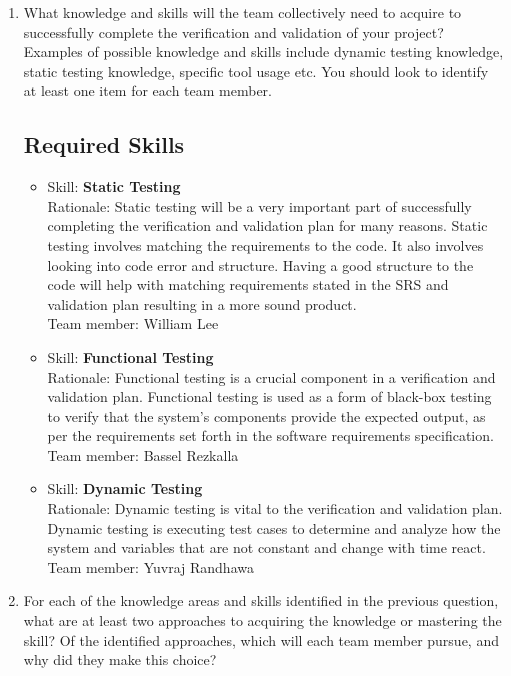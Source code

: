 \documentclass[12pt, titlepage]{article}
\begin{document}
	\begin{enumerate}
		\item What knowledge and skills will the team collectively need to acquire to
		successfully complete the verification and validation of your project?
		Examples of possible knowledge and skills include dynamic testing knowledge,
		static testing knowledge, specific tool usage etc.  You should look to
		identify at least one item for each team member.
		\subsection{Required Skills}
		\begin{itemize}
			\item Skill: \textbf{Static Testing}
			\\ Rationale: Static testing will be a very important part of successfully completing the verification and validation plan for many reasons. Static testing involves matching the requirements to the code. It also involves looking into code error and structure. Having a good structure to the code will help with matching requirements stated in the SRS and validation plan resulting in a more sound product.
			\\ Team member: William Lee
			
			\item Skill: \textbf{Functional Testing}
			\\ Rationale: Functional testing is a crucial component in a verification and validation plan. Functional testing is used as a form of black-box testing to verify that the system's components provide the expected output, as per the requirements set forth in the software requirements specification.
			\\ Team member: Bassel Rezkalla

			\item Skill: \textbf{Dynamic Testing}
			\\ Rationale: Dynamic testing is vital to the verification and validation plan. Dynamic testing is executing test cases to determine and analyze how the system and variables that are not constant and change with time react.
			\\ Team member: Yuvraj Randhawa

		\end{itemize}
		\item For each of the knowledge areas and skills identified in the previous
		question, what are at least two approaches to acquiring the knowledge or
		mastering the skill?  Of the identified approaches, which will each team
		member pursue, and why did they make this choice?

\end{enumerate}
\end{document}
